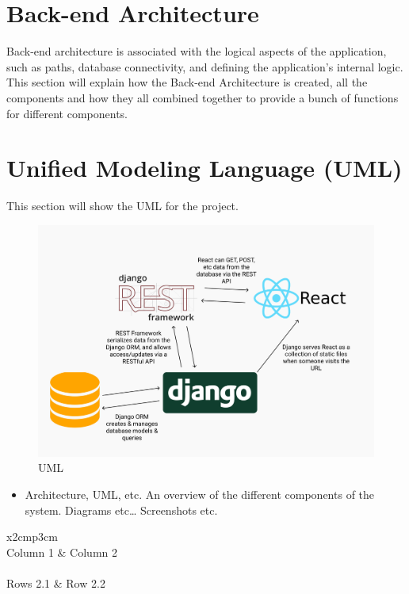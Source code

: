 \section{Back-end Architecture}
\label{BackEnd}
Back-end architecture is associated with the logical aspects of the application, such as paths, database connectivity, and defining the application's internal logic. This section will explain how  the Back-end Architecture is created, all the components and how they all combined together to provide a bunch of functions for different components.

\section{Unified Modeling Language (UML)}
This section will show the UML for the project.

\begin{figure}[h]
\centering
\includegraphics[scale=0.2]{img/UML.png}
\caption{UML}
\label{UML}
\end{figure}


\begin{itemize}
\item Architecture, UML, etc. An overview of the different components of the system. Diagrams etc… Screenshots etc.
\end{itemize}

\begin{table}[h]
  \centering
  \begin{tabular}{x{2cm}p{3cm}}
    \toprule \\
    Column 1 & Column 2 \\
    \midrule \\
    Rows 2.1 & Row 2.2 \\
    \bottomrule
  \end{tabular}
  \caption{A table.}
  \label{table:mytable}
\end{table}

